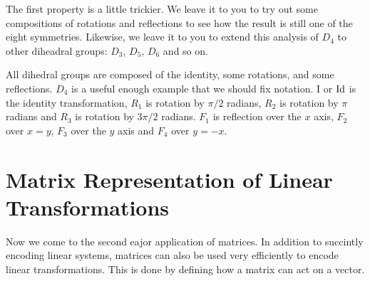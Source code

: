 \documentclass[fleqn]{report}
\begin{document}
The first property is a little trickier. We leave it to you to
try out some compositions of rotations and reflections to see
how the result is still one of the eight symmetries. Likewise,
we leave it to you to extend this analysis of $D_4$ to other
diheadral groups: $D_3$, $D_5$, $D_6$ and so on.

All dihedral groups are composed of the identity, some
rotations, and some reflections. $D_4$ is a useful enough
example that we should fix notation. I or $\mathrm{Id}$ is the
identity transformation, $R_1$ is rotation by $\pi/2$ radians,
$R_2$ is rotation by $\pi $radians and $R_3$ is rotation by
$3\pi/2$ radians. $F_1$ is reflection over the $x$ axis, $F_2$
over $x=y$, $F_3$ over the $y$ axis and $F_4$ over $y=-x$.

\chapter{Matrix Representation of Linear Transformations}

Now we come to the second eajor application of matrices. In
addition to succintly encoding linear systems, matrices can
also be used very efficiently to encode linear
transformations. This is done by defining how a matrix can act
on a vector.
\end{document}
